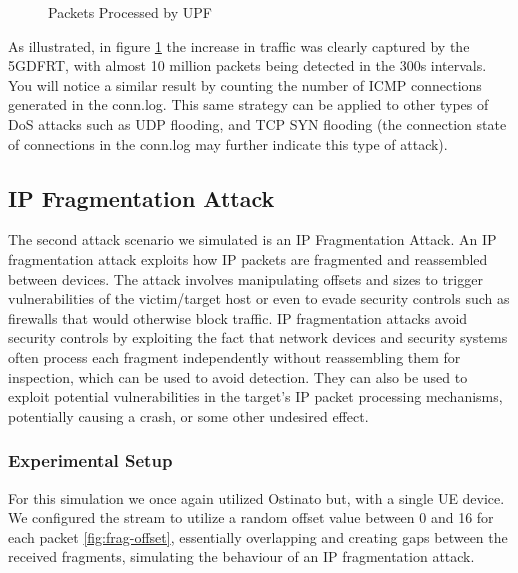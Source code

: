 \documentclass[final,1p,times,authoryear]{elsarticle}
\begin{document}
\begin{figure}[H]
  \centering
  \caption{Packets Processed by UPF}
  \label{fig:dos-indication}
\end{figure}

As illustrated, in figure \ref{fig:dos-indication} the increase in traffic was clearly captured by the 5GDFRT, with almost 10 million packets being detected in the 300s intervals. You will notice a similar result by counting the number of ICMP connections generated in the conn.log. This same strategy can be applied to other types of DoS attacks such as UDP flooding, and TCP SYN flooding (the connection state of connections in the conn.log may further indicate this type of attack).
 
\subsection{IP Fragmentation Attack}
\label{sub4sub2}
The second attack scenario we simulated is an IP Fragmentation Attack. An IP fragmentation attack exploits how IP packets are fragmented and reassembled between devices. The attack involves manipulating offsets and sizes to trigger vulnerabilities of the victim/target host or even to evade security controls such as firewalls that would otherwise block traffic. IP fragmentation attacks avoid security controls by exploiting the fact that network devices and security systems often process each fragment independently without reassembling them for inspection, which can be used to avoid detection. They can also be used to exploit potential vulnerabilities in the target's IP packet processing mechanisms, potentially causing a crash, or some other undesired effect.

\subsubsection{Experimental Setup}
\label{sub4sub2sec1}
For this simulation we once again utilized Ostinato but, with a single UE device. We configured the stream to utilize a random offset value between 0 and 16 for each packet \ref{fig:frag-offset}, essentially overlapping and creating gaps between the received fragments, simulating the behaviour of an IP fragmentation attack.
\end{document}
